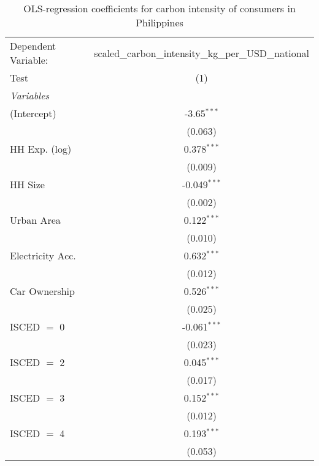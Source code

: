 
\begin{table}[htbp!]
   \centering
   \small
   \begin{adjustbox}{width = 1\textwidth, max height = 0.95\textheight, center}
      \begin{threeparttable}[b]
         \caption{\label{tab:OLS_1_PHL} OLS-regression coefficients for carbon intensity of consumers in Philippines}
         \begin{tabular}{lc}
            \tabularnewline \midrule \midrule
            Dependent Variable: & scaled\_carbon\_intensity\_kg\_per\_USD\_national\\        
            Test                & (1)\\  
            \midrule
            \emph{Variables}\\
            (Intercept)         & -3.65$^{***}$\\   
                                & (0.063)\\   
            HH Exp. (log)       & 0.378$^{***}$\\   
                                & (0.009)\\   
            HH Size             & -0.049$^{***}$\\   
                                & (0.002)\\   
            Urban Area          & 0.122$^{***}$\\   
                                & (0.010)\\   
            Electricity Acc.    & 0.632$^{***}$\\   
                                & (0.012)\\   
            Car Ownership       & 0.526$^{***}$\\   
                                & (0.025)\\   
            ISCED $=$ 0         & -0.061$^{***}$\\   
                                & (0.023)\\   
            ISCED $=$ 2         & 0.045$^{***}$\\   
                                & (0.017)\\   
            ISCED $=$ 3         & 0.152$^{***}$\\   
                                & (0.012)\\   
            ISCED $=$ 4         & 0.193$^{***}$\\   
                                & (0.053)\\   

\end{tabular}
\end{threeparttable}
\end{adjustbox}
\end{table}

